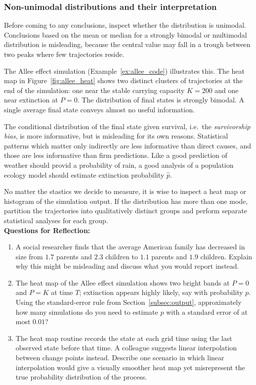 \subsubsection{Non-unimodal distributions and their interpretation}\label{subsubsec:non_unimodal}

Before coming to any conclusions, inspect whether the distribution is unimodal. Conclusions based on the mean or median for a strongly bimodal or multimodal distribution is misleading, because the central value may fall in a trough between two peaks where few trajectories reside.

The Allee effect simulation (Example~\ref{ex:allee_code}) illustrates this. The heat map in Figure~\ref{fig:allee_heat} shows two distinct clusters of trajectories at the end of the simulation: one near the stable carrying capacity $K = 200$ and one near extinction at $P = 0$. The distribution of final states is strongly bimodal. A single average final state conveys almost no useful information.

The conditional distribution of the final state given survival, i.e.\ the \textit{survivorship bias}, is more informative, but is misleading for its own reasons. Statistical patterns which matter only indirectly are less informative than direct causes, and those are less informative than firm predictions. Like a good prediction of weather should provid a probability of rain, a good analysis of a population ecology model should estimate extinction probability $\hat{p}$.

No matter the stastics we decide to measure, it is wise to inspect a heat map or histogram of the simulation output. If the distribution has more than one mode, partition the trajectories into qualitatively distinct groups and perform separate statistical analyses for each group.\\

\noindent \textup{{\bf Questions for Reflection:}}
\begin{enumerate}
\item A social researcher finds that the average American family has decreased in size from $1.7$ parents and $2.3$ children to $1.1$ parents and $1.9$ children. Explain why this might be misleading and discuss what you would report instead.

\item The heat map of the Allee effect simulation shows two bright bands at $P = 0$ and $P = K$ at time $T$; extinction appears highly likely, say with probability $p$. Using the standard-error rule from Section~\ref{subsec:output}, approximately how many simulations do you need to estimate $p$ with a standard error of at most $0.01$?

\item The heat map routine records the state at each grid time using the last observed state before that time. A colleague suggests linear interpolation between change points instead. Describe one scenario in which linear interpolation would give a visually smoother heat map yet misrepresent the true probability distribution of the process.
\end{enumerate}
